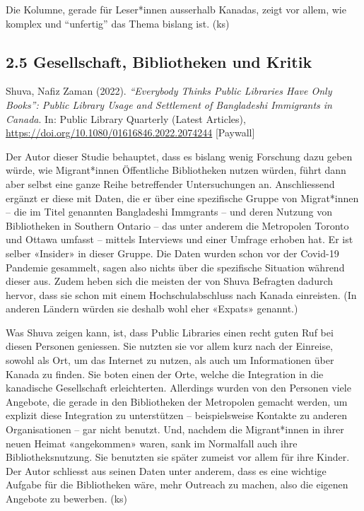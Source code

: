 \documentclass[a4paper,
fontsize=11pt,
oneside,
numbers=noperiodatend,
parskip=half-,
bibliography=totoc,
final
]{scrartcl}
\begin{document}
Die Kolumne, gerade für Leser*innen ausserhalb Kanadas, zeigt vor allem,
wie komplex und \enquote{unfertig} das Thema bislang ist. (ks)

\hypertarget{gesellschaft-bibliotheken-und-kritik}{%
\subsection{2.5 Gesellschaft, Bibliotheken und
Kritik}\label{gesellschaft-bibliotheken-und-kritik}}

Shuva, Nafiz Zaman (2022). \emph{\enquote{Everybody Thinks Public
Libraries Have Only Books}: Public Library Usage and Settlement of
Bangladeshi Immigrants in Canada}. In: Public Library Quarterly (Latest
Articles), \url{https://doi.org/10.1080/01616846.2022.2074244}
{[}Paywall{]}

Der Autor dieser Studie behauptet, dass es bislang wenig Forschung dazu
geben würde, wie Migrant*innen Öffentliche Bibliotheken nutzen würden,
führt dann aber selbst eine ganze Reihe betreffender Untersuchungen an.
Anschliessend ergänzt er diese mit Daten, die er über eine spezifische
Gruppe von Migrat*innen -- die im Titel genannten Bangladeshi Immgrants
-- und deren Nutzung von Bibliotheken in Southern Ontario -- das unter
anderem die Metropolen Toronto und Ottawa umfasst -- mittels Interviews
und einer Umfrage erhoben hat. Er ist selber «Insider» in dieser Gruppe.
Die Daten wurden schon vor der Covid-19 Pandemie gesammelt, sagen also
nichts über die spezifische Situation während dieser aus. Zudem heben
sich die meisten der von Shuva Befragten dadurch hervor, dass sie schon
mit einem Hochschulabschluss nach Kanada einreisten. (In anderen Ländern
würden sie deshalb wohl eher «Expats» genannt.)

Was Shuva zeigen kann, ist, dass Public Libraries einen recht guten Ruf
bei diesen Personen geniessen. Sie nutzten sie vor allem kurz nach der
Einreise, sowohl als Ort, um das Internet zu nutzen, als auch um
Informationen über Kanada zu finden. Sie boten einen der Orte, welche
die Integration in die kanadische Gesellschaft erleichterten. Allerdings
wurden von den Personen viele Angebote, die gerade in den Bibliotheken
der Metropolen gemacht werden, um explizit diese Integration zu
unterstützen -- beispielsweise Kontakte zu anderen Organisationen -- gar
nicht benutzt. Und, nachdem die Migrant*innen in ihrer neuen Heimat
«angekommen» waren, sank im Normalfall auch ihre Bibliotheksnutzung. Sie
benutzten sie später zumeist vor allem für ihre Kinder. Der Autor
schliesst aus seinen Daten unter anderem, dass es eine wichtige Aufgabe
für die Bibliotheken wäre, mehr Outreach zu machen, also die eigenen
Angebote zu bewerben. (ks)
\end{document}
